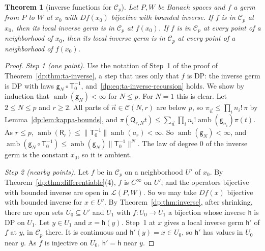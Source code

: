 \documentclass[11pt]{amsart}
\newtheorem{theorem}{Theorem}[section]
\theoremstyle{definition}
\theoremstyle{remark}
\numberwithin{equation}{section}
\newcommand{\cL}{\mathcal L}
\newcommand{\norm}[1]{\lVert #1\rVert}
\newcommand{\cC}{\mathcal{C}}
\theoremstyle{plain}
\theoremstyle{definition}
\theoremstyle{plain}
\begin{document}
\begin{theorem}[inverse functions for $\cC_p$]\label{dp:thm:cp-inverse}
Let $P,W$ be Banach spaces and $f$ a germ from $P$ to $W$ at $x_0$ with $Df(x_0)$ bijective with bounded inverse. If $f$ is in $\cC_p$ at $x_0$, then its local inverse germ is in $\cC_p$ at $f(x_0)$. If $f$ is in $\cC_p$ at every point of a neighborhood of $x_0$, then its local inverse germ is in $\cC_p$ at every point of a neighborhood of $f(x_0)$.
\end{theorem}

\begin{proof}
\emph{Step 1 (one point).} Use the notation of Step~1 of the proof of Theorem~\ref{dp:thm:ta-inverse}, a step that uses only that $f$ is DP: the inverse germ is DP with laws $\mathsf g_N\circ\mathsf T_0^{-1}$, and~\eqref{dp:eq:ta-inverse-recursion} holds. We show by induction that $\operatorname{amb}(\mathsf g_N)<\infty$ for $N\le p$. For $N=1$ this is clear. Let $2\le N\le p$ and $r\ge2$. All parts of $\vec n\in\mathcal C(N,r)$ are below $p$, so $\pi_{\vec n}\le\prod_in_i!\,\pi$ by Lemma~\ref{dp:lem:kappa-bounds}, and $\pi(\mathsf Q_{r,N}t)\le\sum_{\vec n}\prod_in_i!\operatorname{amb}(\mathsf g_{n_i})\pi(t)$. As $r\le p$, $\operatorname{amb}(\mathsf R_r)\le\norm{\mathsf T_0^{-1}}\operatorname{amb}(a_r)<\infty$. So $\operatorname{amb}(\mathsf g_N)<\infty$, and $\operatorname{amb}(\mathsf g_N\circ\mathsf T_0^{-1})\le\operatorname{amb}(\mathsf g_N)\norm{\mathsf T_0^{-1}}^N$. The law of degree $0$ of the inverse germ is the constant $x_0$, so it is ambient.

\emph{Step 2 (nearby points).} Let $f$ be in $\cC_p$ on a neighborhood $U'$ of $x_0$. By Theorem~\ref{dp:thm:differentiable}(4), $f$ is $C^\infty$ on $U'$, and the operators bijective with bounded inverse are open in $\cL(P,W)$. So we may take $Df(x)$ bijective with bounded inverse for $x\in U'$. By Theorem~\ref{dp:thm:inverse}, after shrinking, there are open sets $U_0\subseteq U'$ and $U_1$ with $f\colon U_0\to U_1$ a bijection whose inverse $\mathsf h$ is DP on $U_1$. Let $y\in U_1$ and $x=\mathsf h(y)$. Step~1 at $x$ gives a local inverse germ $\mathsf h'$ of $f$ at $y$, in $\cC_p$ there. It is continuous and $\mathsf h'(y)=x\in U_0$, so $\mathsf h'$ has values in $U_0$ near $y$. As $f$ is injective on $U_0$, $\mathsf h'=\mathsf h$ near $y$.
\end{proof}
\end{document}
